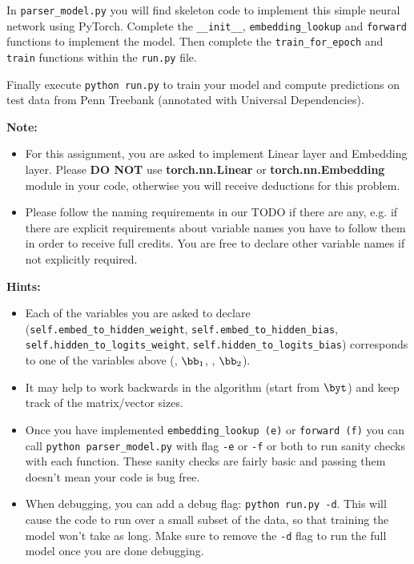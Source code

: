 \begin{parts}
\begin{enumerate}[label=\roman*.]
   In \texttt{parser\_model.py} you will find skeleton code to implement this simple neural network using PyTorch. Complete the \texttt{\_\_init\_\_}, \texttt{embedding\_lookup} and \texttt{forward} functions to implement the model. Then complete the \texttt{train\_for\_epoch} and \texttt{train} functions within the \texttt{run.py} file.
   
    Finally execute \texttt{python run.py} to train your model and compute predictions
    on test data from Penn Treebank (annotated with Universal Dependencies). 
    
    \textbf{Note:}
    \begin{itemize}
        \item For this assignment, you are asked to implement Linear layer and Embedding layer. Please \textbf{DO NOT} use \textbf{torch.nn.Linear} or  \textbf{torch.nn.Embedding} module in your code, otherwise you will receive deductions for this problem. 
        \item Please follow the naming requirements in our TODO if there are any, e.g. if there are explicit requirements about variable names you have to follow them in order to receive full credits. You are free to declare other variable names if not explicitly required. 
    \end{itemize}
    
    \textbf{Hints:}
    \begin{itemize}
        \item Each of the variables you are asked to declare (\texttt{self.embed\_to\_hidden\_weight}, \newline \texttt{self.embed\_to\_hidden\_bias}, \texttt{self.hidden\_to\_logits\_weight}, \newline \texttt{self.hidden\_to\_logits\_bias}) corresponds to one of the variables above (\bW, $\bb_1$, \bU, $\bb_2$).  
        \item It may help to work backwards in the algorithm (start from $\byt$) and keep track of the matrix/vector sizes.  
        \item Once you have implemented \texttt{embedding\_lookup (e)} or \texttt{forward (f)} you can call \texttt{python parser\_model.py} with flag \texttt{-e} or \texttt{-f} or both to run sanity checks with each function. These sanity checks are fairly basic and passing them doesn't mean your code is bug free.
        \item
            When debugging, you can add a debug flag: \texttt{python run.py -d}. This will cause the code to run over a small subset of the data, so that training the model won't take as long. Make sure to remove the \texttt{-d} flag to run the full model once you are done debugging.


\end{itemize}
\end{enumerate}
\end{parts}
